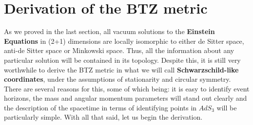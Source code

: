 %
\section{Derivation of the BTZ metric}
As we proved in the last section, all vacuum solutions to the \textbf{Einstein Equations} in (2+1) dimensions are locally isomorphic to either de Sitter space, anti-de Sitter space or Minkowski space. Thus, all the information about any particular solution will be contained in its topology. Despite this, it is still very worthwhile to derive the BTZ metric in what we will call \textbf{Schwarzschild-like coordinates}, under the assumptions of stationarity and circular symmetry. There are several reasons for this, some of which being: it is easy to identify event horizons, the mass and angular momentum parameters will stand out clearly and the description of the spacetime in terms of identifying points in $AdS_3$ will be particularly simple. With all that said, let us begin the derivation.

